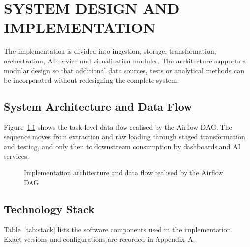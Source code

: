 \documentclass[12pt,a4paper]{report}
\begin{document}
\chapter{SYSTEM DESIGN AND IMPLEMENTATION}

\noindent The implementation is divided into ingestion, storage, transformation, orchestration, AI-service and visualisation modules. The architecture supports a modular design so that additional data sources, tests or analytical methods can be incorporated without redesigning the complete system.

\section{System Architecture and Data Flow}
Figure~\ref{fig:flow} shows the task-level data flow realised by the Airflow DAG. The sequence moves from extraction and raw loading through staged transformation and testing, and only then to downstream consumption by dashboards and AI services.

\begin{figure}[htbp]
\centering
{}
\caption{Implementation architecture and data flow realised by the Airflow DAG}
\label{fig:flow}
\end{figure}

\section{Technology Stack}
Table~\ref{tab:stack} lists the software components used in the implementation. Exact versions and configurations are recorded in Appendix~A.
\end{document}
